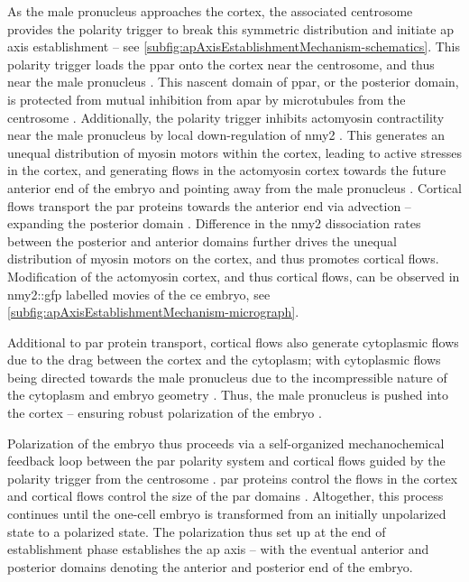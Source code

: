 As the male pronucleus approaches the cortex, the associated centrosome provides the polarity trigger to break this symmetric distribution and initiate \ac{ap} axis establishment \citep{wallenfang2000polarization,hoege2013principles,bienkowska2012centrosomes} -- see \autoref{subfig:apAxisEstablishmentMechanism-schematics}. This polarity trigger loads the \ac{ppar} onto the cortex near the centrosome, and thus near the male pronucleus \citep{wallenfang2000polarization,cowan2004centrosomes,gross2019guiding}. This nascent domain of \ac{ppar}, or the posterior domain, is protected from mutual inhibition from \ac{apar} by microtubules from the centrosome \citep{motegi2011microtubules}. Additionally, the polarity trigger inhibits actomyosin contractility near the male pronucleus by local down-regulation of \ac{nmy2} \citep{motegi2006sequential}. This generates an unequal distribution of myosin motors within the cortex, leading to active stresses in the cortex, and generating flows in the actomyosin cortex towards the future anterior end of the embryo and pointing away from the male pronucleus \citep{munro2004cortical,mayer2010anisotropies}. Cortical flows transport the \ac{par} proteins towards the anterior end via advection -- expanding the posterior domain \citep{goehring2011advectionpolarization}. Difference in the \ac{nmy2} dissociation rates between the posterior and anterior domains \citep{gross2019guiding} further drives the unequal distribution of myosin motors on the cortex, and thus promotes cortical flows. Modification of the actomyosin cortex, and thus cortical flows, can be observed in \ac{nmy2}::\ac{gfp} labelled movies of the \ac{ce} embryo, see \autoref{subfig:apAxisEstablishmentMechanism-micrograph}.

Additional to \ac{par} protein transport, cortical flows also generate cytoplasmic flows due to the drag between the cortex and the cytoplasm; with cytoplasmic flows being directed towards the male pronucleus due to the incompressible nature of the cytoplasm and embryo geometry \citep{niwayama2011hydrodynamic}. Thus, the male pronucleus is pushed into the cortex -- ensuring robust polarization of the embryo \citep{gubieda2020going}. 

Polarization of the embryo thus proceeds via a self-organized mechanochemical feedback loop between the \ac{par} polarity system and cortical flows guided by the polarity trigger from the centrosome \citep{gross2019guiding,bois2011pattern,gross2017active}. \ac{par} proteins control the flows in the cortex \citep{gross2019guiding} and cortical flows control the size of the \ac{par} domains \citep{munro2004cortical,goehring2011advectionpolarization}. Altogether, this process continues until the one-cell embryo is transformed from an initially unpolarized state to a polarized state. The polarization thus set up at the end of establishment phase establishes the \ac{ap} axis -- with the eventual anterior and posterior domains denoting the anterior and posterior end of the embryo. 

